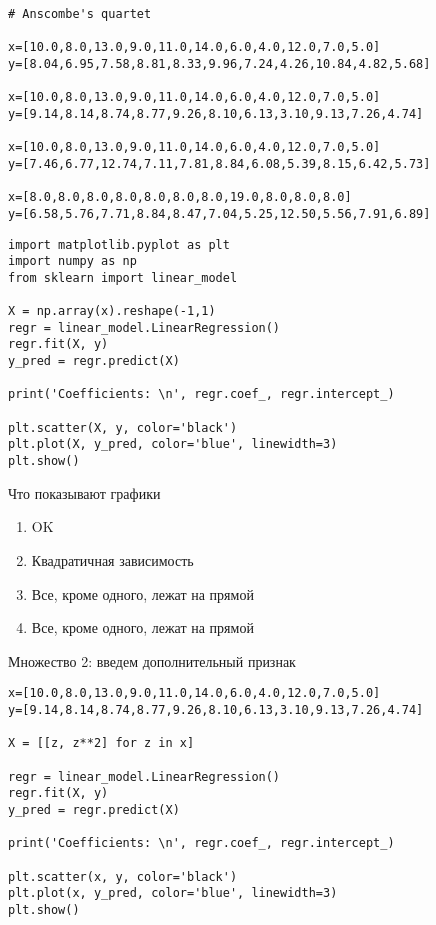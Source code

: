 \documentclass[landscape]{slides}
\begin{document}
\begin{slide}
\begin{verbatim}
# Anscombe's quartet

x=[10.0,8.0,13.0,9.0,11.0,14.0,6.0,4.0,12.0,7.0,5.0]
y=[8.04,6.95,7.58,8.81,8.33,9.96,7.24,4.26,10.84,4.82,5.68]

x=[10.0,8.0,13.0,9.0,11.0,14.0,6.0,4.0,12.0,7.0,5.0]
y=[9.14,8.14,8.74,8.77,9.26,8.10,6.13,3.10,9.13,7.26,4.74]

x=[10.0,8.0,13.0,9.0,11.0,14.0,6.0,4.0,12.0,7.0,5.0]
y=[7.46,6.77,12.74,7.11,7.81,8.84,6.08,5.39,8.15,6.42,5.73]

x=[8.0,8.0,8.0,8.0,8.0,8.0,8.0,19.0,8.0,8.0,8.0]
y=[6.58,5.76,7.71,8.84,8.47,7.04,5.25,12.50,5.56,7.91,6.89]
\end{verbatim}
\end{slide}

\begin{slide}
\begin{verbatim}
import matplotlib.pyplot as plt
import numpy as np
from sklearn import linear_model

X = np.array(x).reshape(-1,1)
regr = linear_model.LinearRegression()
regr.fit(X, y)
y_pred = regr.predict(X)
  
print('Coefficients: \n', regr.coef_, regr.intercept_)
  
plt.scatter(X, y, color='black')
plt.plot(X, y_pred, color='blue', linewidth=3)
plt.show()
\end{verbatim}
\end{slide}


\begin{slide}
Что показывают графики
\begin{enumerate}
\item OK
\item Квадратичная зависимость
\item Все, кроме одного, лежат на прямой
\item Все, кроме одного, лежат на прямой
\end{enumerate}
\end{slide}

\begin{slide}
Множество 2: введем дополнительный признак
\begin{verbatim}
x=[10.0,8.0,13.0,9.0,11.0,14.0,6.0,4.0,12.0,7.0,5.0]
y=[9.14,8.14,8.74,8.77,9.26,8.10,6.13,3.10,9.13,7.26,4.74]

X = [[z, z**2] for z in x]

regr = linear_model.LinearRegression()
regr.fit(X, y)
y_pred = regr.predict(X)
  
print('Coefficients: \n', regr.coef_, regr.intercept_)

plt.scatter(x, y, color='black')
plt.plot(x, y_pred, color='blue', linewidth=3)
plt.show()
\end{verbatim}
\end{slide}
\end{document}
